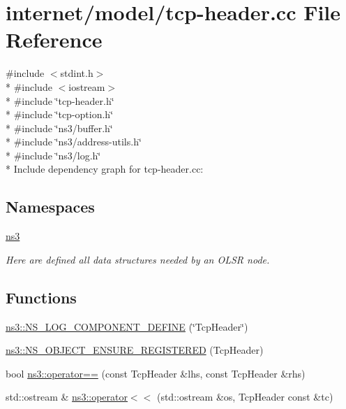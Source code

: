 \hypertarget{tcp-header_8cc}{}\section{internet/model/tcp-\/header.cc File Reference}
\label{tcp-header_8cc}
{\ttfamily \#include $<$stdint.\+h$>$}\\*
{\ttfamily \#include $<$iostream$>$}\\*
{\ttfamily \#include \char`\"{}tcp-\/header.\+h\char`\"{}}\\*
{\ttfamily \#include \char`\"{}tcp-\/option.\+h\char`\"{}}\\*
{\ttfamily \#include \char`\"{}ns3/buffer.\+h\char`\"{}}\\*
{\ttfamily \#include \char`\"{}ns3/address-\/utils.\+h\char`\"{}}\\*
{\ttfamily \#include \char`\"{}ns3/log.\+h\char`\"{}}\\*
Include dependency graph for tcp-\/header.cc\+:
\subsection*{Namespaces}
\begin{DoxyCompactItemize}
\item 
 \hyperlink{namespacens3}{ns3}
\begin{DoxyCompactList}\small\item\em Here are defined all data structures needed by an O\+L\+SR node. \end{DoxyCompactList}\end{DoxyCompactItemize}
\subsection*{Functions}
\begin{DoxyCompactItemize}
\item 
\hyperlink{namespacens3_abd70d824d447faa3872329fc65c62cd4}{ns3\+::\+N\+S\+\_\+\+L\+O\+G\+\_\+\+C\+O\+M\+P\+O\+N\+E\+N\+T\+\_\+\+D\+E\+F\+I\+NE} (\char`\"{}Tcp\+Header\char`\"{})
\item 
\hyperlink{namespacens3_a5e70c4de29e419de2bec637d3d299f36}{ns3\+::\+N\+S\+\_\+\+O\+B\+J\+E\+C\+T\+\_\+\+E\+N\+S\+U\+R\+E\+\_\+\+R\+E\+G\+I\+S\+T\+E\+R\+ED} (Tcp\+Header)
\item 
bool \hyperlink{namespacens3_ad353d64c69c57b23c093e63c15625800}{ns3\+::operator==} (const Tcp\+Header \&lhs, const Tcp\+Header \&rhs)
\item 
std\+::ostream \& \hyperlink{namespacens3_af8b149beb7ee1d328a8b43817a68ebad}{ns3\+::operator$<$$<$} (std\+::ostream \&os, Tcp\+Header const \&tc)
\end{DoxyCompactItemize}
